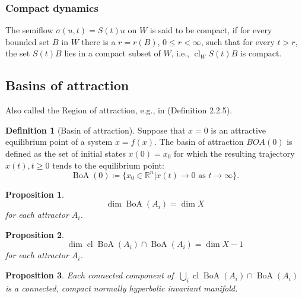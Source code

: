 \documentclass{article}
\newtheorem{proposition}{Proposition}
\theoremstyle{definition} \newtheorem{definition}{Definition}
\theoremstyle{remark} \newtheorem{remark}{Remark}
\newcommand{\reals}{\mathbb{R}}
\newcommand{\cl}{\operatorname{cl}}
\newcommand{\boa}{\operatorname{BoA}}
\newcounter{ct}
\begin{document}
\subsubsection{Compact dynamics}
The semiflow $\sigma(u, t) = S(t)u$ on $W$ is said to be compact, if for every bounded set $B$ in $W$ there is a $r = r(B)$, $0 \leq r < \infty$, such that for every $t> r$, the set $S(t)B$ lies in a compact subset of $W$, i.e., $\cl_WS(t)B$ is compact. 


\subsection{Basins of attraction}\label{sec:boa}
\citep{milnor1985attractor}
\citep{hirsch1995computing}

Also called the Region of attraction, e.g., in \citep{garces2012strategies} (Definition 2.2.5).
\begin{definition}[Basin of attraction]
Suppose that $x=0$ is an attractive equilibrium point of a system $\dot x = f(x)$.
The basin of attraction $BOA(0)$ is defined as the set of initial states $x(0)=x_0$ for which the resulting trajectory $x(t), t\geq 0$ tends to the equilibrium point:
\begin{equation}
\boa(0) \coloneqq \{x_0\in \reals^n|x(t)\rightarrow0\text{ as } t\rightarrow\infty\}.
\end{equation}

\end{definition}


\begin{proposition}
\[\dim \boa(A_i) = \dim X\] for each attractor $A_i$.
\end{proposition}
\begin{proposition}
\[\dim\cl \boa(A_i) \cap \boa(A_i) = \dim X - 1 \] for each attractor $A_i$.
\end{proposition}



\begin{proposition}
Each connected component of $\ \bigcup_i\cl \boa(A_i) \cap \boa(A_i) $ is a connected, compact normally hyperbolic invariant manifold. %
\end{proposition}
\end{document}
